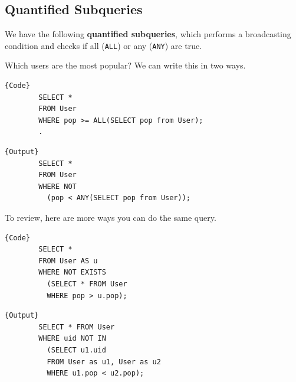 \documentclass{article}
\begin{document}
  \subsection{Quantified Subqueries}

    \begin{definition}
      We have the following \textbf{quantified subqueries}, which performs a broadcasting condition and checks if all (\texttt{ALL}) or any (\texttt{ANY}) are true. 
    \end{definition}

    \begin{example}
      Which users are the most popular? We can write this in two ways. 

      \noindent\begin{minipage}{.5\textwidth}
      \begin{lstlisting}[]{Code}
        SELECT * 
        FROM User 
        WHERE pop >= ALL(SELECT pop from User); 
        .
      \end{lstlisting}
      \end{minipage}
      \hfill
      \begin{minipage}{.49\textwidth}
      \begin{lstlisting}[]{Output}
        SELECT * 
        FROM User 
        WHERE NOT 
          (pop < ANY(SELECT pop from User)); 
      \end{lstlisting}
      \end{minipage}

      To review, here are more ways you can do the same query. 

      \noindent\begin{minipage}{.5\textwidth}
      \begin{lstlisting}[]{Code}
        SELECT * 
        FROM User AS u 
        WHERE NOT EXISTS  
          (SELECT * FROM User
          WHERE pop > u.pop); 
      \end{lstlisting}
      \end{minipage}
      \hfill
      \begin{minipage}{.49\textwidth}
      \begin{lstlisting}[]{Output}
        SELECT * FROM User 
        WHERE uid NOT IN 
          (SELECT u1.uid
          FROM User as u1, User as u2 
          WHERE u1.pop < u2.pop); 
      \end{lstlisting}
      \end{minipage}
    \end{example}
\end{document}
